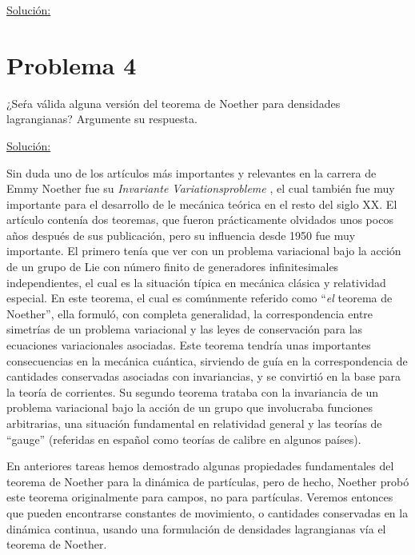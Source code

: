 \documentclass[a4paper,10pt]{article}
\numberwithin{equation}{section}
\begin{document}
\vspace{.3cm}

\underline{Solución:} \vspace{.3cm}

\section{Problema 4}

¿Seŕa válida alguna versión del teorema de Noether para densidades lagrangianas? Argumente 
su respuesta.

\vspace{.3cm}

\underline{Solución:} \vspace{.3cm}

Sin duda uno de los artículos más importantes y relevantes en la carrera de 
Emmy Noether fue su \emph{Invariante Variationsprobleme} \cite{noether}, el cual también 
fue muy importante para el desarrollo de le mecánica teórica en el resto del siglo 
XX. El artículo contenía dos teoremas, que fueron prácticamente olvidados unos pocos 
años después de sus publicación, pero su influencia desde 1950 fue muy importante. 
El primero tenía que ver con un problema variacional bajo la acción de un grupo de 
Lie con número finito de generadores infinitesimales independientes, el cual es 
la situación típica en mecánica clásica y relatividad especial. En este teorema, 
el cual es comúnmente referido como ``\emph{el} teorema de Noether'', ella formuló, 
con completa generalidad, la correspondencia entre simetrías de un problema variacional 
y las leyes de conservación para las ecuaciones variacionales asociadas. Este teorema 
tendría unas importantes consecuencias en la mecánica cuántica, sirviendo de guía 
en la correspondencia de cantidades conservadas asociadas con invariancias, y se 
convirtió en la base para la teoría de corrientes. Su segundo teorema trataba con 
la invariancia de un problema variacional bajo la acción de un grupo que involucraba 
funciones arbitrarias, una situación fundamental en relatividad general y las 
teorías de ``gauge'' (referidas en español como teorías de calibre en algunos países).

\vspace{.3cm}

En anteriores tareas hemos demostrado algunas propiedades fundamentales del teorema de 
Noether para la dinámica de partículas, pero de hecho, Noether probó este teorema 
originalmente para campos, no para partículas. Veremos entonces que pueden encontrarse 
constantes de movimiento, o cantidades conservadas en la dinámica continua, usando 
una formulación de densidades lagrangianas vía el teorema de Noether.
\end{document}
